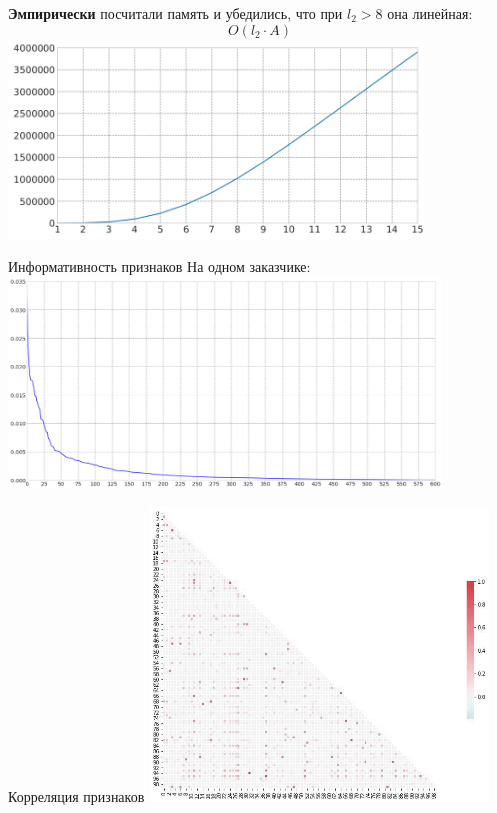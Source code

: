 \begin{frame}
	\textbf{Эмпирически} посчитали память и убедились, что при $l_2 > 8$ она линейная:
	\begin{equation}
	O(l_2 \cdot A)
	\end{equation}
	\includegraphics[width=11cm]{../pic/beh/O_memory.png}
\end{frame}

\begin{frame}{Информативность признаков}
	На одном заказчике:
	\centering
	\includegraphics[width=11.5cm]{../pic/beh/informativity.png}
\end{frame}

\begin{frame}{Корреляция признаков}
\centering
\includegraphics[width=9cm]{../pic/beh/feature_correlation.png}

\end{frame}


